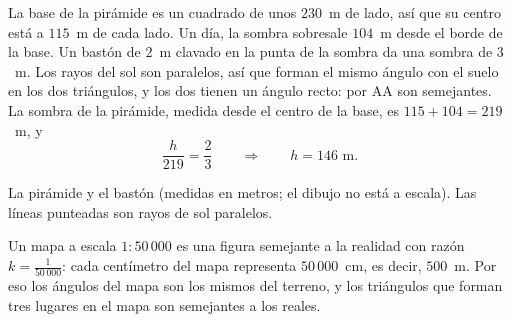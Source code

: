 \documentclass[11pt]{article}
\begin{document}
\begin{ejemplo}
La base de la pirámide es un cuadrado de unos $230$~m de lado, así que su
centro está a $115$~m de cada lado. Un día, la sombra sobresale $104$~m
desde el borde de la base. Un bastón de $2$~m clavado en la punta de la
sombra da una sombra de $3$~m. Los rayos del sol son paralelos, así que
forman el mismo ángulo con el suelo en los dos triángulos, y los dos tienen
un ángulo recto: por AA son semejantes. La sombra de la pirámide, medida
desde el centro de la base, es $115 + 104 = 219$~m, y
\[
  \frac{h}{219} = \frac{2}{3} \qquad\Longrightarrow\qquad h = 146 \text{ m}.
\]
\end{ejemplo}

\begin{center}

{\small La pirámide y el bastón (medidas en metros; el dibujo no está a escala). Las líneas
punteadas son rayos de sol paralelos.}
\end{center}

\begin{aplicacion}
Un mapa a escala $1:50\,000$ es una figura semejante a la realidad con
razón $k = \frac{1}{50\,000}$: cada centímetro del mapa representa
$50\,000$~cm, es decir, $500$~m. Por eso los ángulos del mapa son los
mismos del terreno, y los triángulos que forman tres lugares en el mapa son
semejantes a los reales.
\end{aplicacion}
\end{document}
